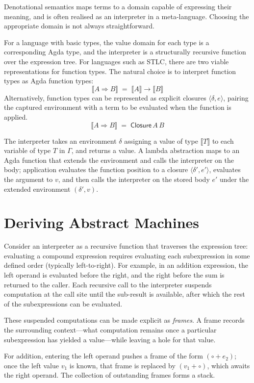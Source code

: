 Denotational semantics maps terms to a domain capable of expressing their meaning, and is often realised as an interpreter in a meta-language.
Choosing the appropriate domain is not always straightforward.

For a language with basic types, the value domain for each type is a corresponding Agda type, and the interpreter is a structurally recursive function over the expression tree.
For languages such as STLC, there are two viable representations for function types. The natural choice is to interpret function types as Agda function types:
\[ \llbracket A \Rightarrow B \rrbracket \;=\; \llbracket A \rrbracket \to \llbracket B \rrbracket \]
Alternatively, function types can be represented as explicit closures $\langle \delta, e \rangle$, pairing the captured environment with a term to be evaluated when the function is applied.
\[ \llbracket A \Rightarrow B \rrbracket \;=\; \mathsf{Closure}\,A\,B \]


The interpreter takes an environment $\delta$ assigning a value of type $\llbracket T \rrbracket$ to each variable of type $T$ in $\Gamma$, and returns a value.
A lambda abstraction maps to an Agda function that extends the environment and calls the interpreter on the body; application evaluates the function position to a closure $\langle \delta', e' \rangle$, evaluates the argument to $v$, and then calls the interpreter on the stored body $e'$ under the extended environment $(\delta', v)$.

\section{Deriving Abstract Machines}

Consider an interpreter as a recursive function that traverses the expression tree: evaluating a compound expression requires evaluating each subexpression in some defined order (typically left-to-right).
For example, in an addition expression, the left operand is evaluated before the right, and the right before the sum is returned to the caller. 
Each recursive call to the interpreter suspends computation at the call site until the sub-result is available, after which the rest of the subexpressions can be evaluated.


These suspended computations can be made explicit as \emph{frames}.
A frame records the surrounding context---what computation remains once a particular subexpression has yielded a value---while leaving a hole for that value.

For addition, entering the left operand pushes a frame of the form $(\circ + e_2)$; once the left value $v_1$ is known, that frame is replaced by $(v_1 + \circ)$, which awaits the right operand.
The collection of outstanding frames forms a stack.

